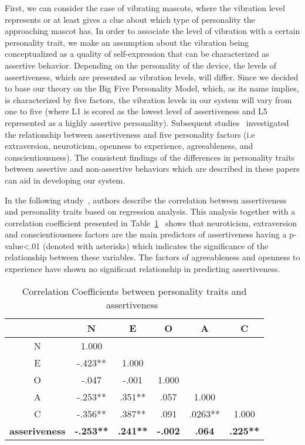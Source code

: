 First, we can consider the case of vibrating mascots, where the vibration level
represents or at least gives a clue about which type of personality the approaching mascot has.
In order to associate the level of vibration with a certain personality trait,
we make an assumption about the vibration being conceptualized as a quality of self-expression
that can be characterized as assertive behavior.
Depending on the personality of the device, the levels of assertiveness,
which are presented as vibration levels, will differ.
Since we decided to base our theory on the Big Five Personality Model, which, as its name implies, is characterized
by five factors, the vibration levels in our system will vary from one to five (where L1 is scored
as the lowest level of assertiveness and L5 represented as a highly assertive personality).
Subsequent studies~\cite{bagherian2016relationship,kirst2011investigating,ramanaiah1993neo,lefevre1981assertiveness}
investigated the relationship between assertiveness and five personality factors (i.e extraversion, neuroticism,
openness to experience, agreeableness, and conscientiousness).
The consistent findings of the differences in personality traits between assertive and
non-assertive behaviors which are described in these papers can aid in developing our system.

In the following study~\cite{bagherian2016relationship}, authors describe the correlation between
assertiveness and personality traits based on regression analysis.
This analysis together with a correlation coefficient
presented in Table~\ref{table:assertiveness}~\cite{bagherian2016relationship} shows that neuroticism,
extraversion and conscientiousness factors are the main predictors of assertiveness
having a p-value\textless .01 (denoted with asterisks) which indicates the significance of the
relationship between these variables.
The factors of agreeableness and openness to experience have shown
no significant relationship in predicting assertiveness.

\begin{table} [h]
\centering
\begin{tabular}{c c c c c c} 
\\
 \hline \hline
						& \textbf{N} 			&\textbf{E}		&\textbf{O}		&\textbf{A}		&\textbf{C}	\\ [0.5ex]
 \hline
 N 						& 1.000 				&				&				&				&	\\ 
 E 						& -.423** 			&1.000			&				&				&	\\
 O 						& -.047 			&-.001			&1.000			&				&	\\
 A 						& -.253** 			&.351**			&.057			&1.000			&	\\
 C 						& -.356** 			&.387**			&.091			&.0263**		&1.000	\\ [1ex]
 \hline
 \textbf{asseriveness}  		& \textbf{-.253**}		&\textbf{.241**}	&\textbf{-.002}		&\textbf{.064}		&\textbf{.225**}	\\
 \hline \hline
 \end{tabular}
\caption[]{Correlation Coefficients between personality traits and assertiveness~\cite{bagherian2016relationship}\footnotemark}
 \label{table:assertiveness}
 \end{table}
 
